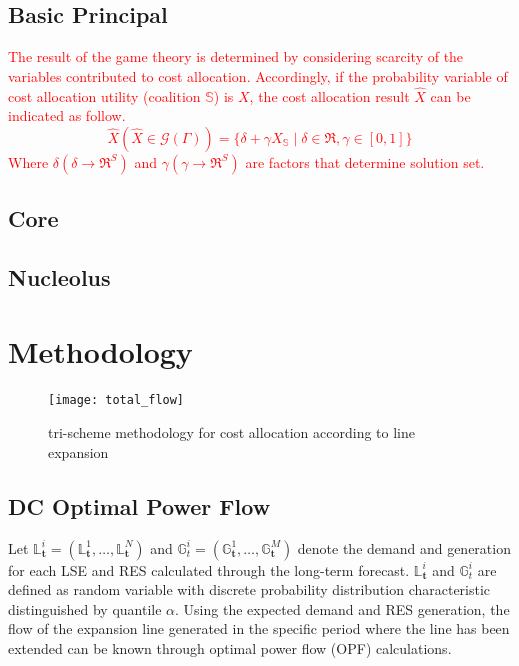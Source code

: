 \documentclass[journal]{IEEEtran} %
\begin{document}
\subsection{Basic Principal}
\textcolor{red}{The result of the game theory is determined by considering scarcity of the variables contributed to cost allocation. Accordingly, if the probability variable of cost allocation utility (coalition $\mathbb{S}$) is $X$, the cost allocation result $\hat{X}$ can be indicated as follow.
\begin{equation}
\hat{X}(\hat{X} \in \mathcal{G}(\Gamma)) = \lbrace \delta+\gamma X_{\mathbb{S}}\;|\;\delta \in \Re, \gamma \in [0,1] \rbrace
\end{equation}
Where $\delta(\delta  \to {\Re ^S})$ and $\gamma(\gamma  \to {\Re ^S})$ are factors that determine solution set. }
\subsection{Core}

\subsection{Nucleolus}

\section{Methodology}
\begin{figure}[t!]
\centering
\texttt{[image: total\_flow]}
\caption{tri-scheme methodology for cost allocation according to line expansion}
\label{totalflow}
\end{figure}

\subsection{DC Optimal Power Flow}
Let ${{\mathbb{L}}_\textbf{t}^i} = (\mathbb{L}_{\textbf{t}}^1,\ldots,\mathbb{L}_{\textbf{t}}^N)$ and ${{\mathbb{G}}_t^i} = (\mathbb{G}_{\textbf{t}}^1,\ldots,\mathbb{G}_{\textbf{t}}^M)$ denote the demand and generation for each LSE and RES calculated through the long-term forecast. ${{\mathbb{L}}_\textbf{t}^i}$ and ${{\mathbb{G}}_t^i}$ are defined as random variable with discrete probability distribution characteristic distinguished by quantile $\alpha$. Using the expected demand and RES generation, the flow of the expansion line generated in the specific period where the line has been extended can be known through optimal power flow (OPF) calculations.
\end{document}
